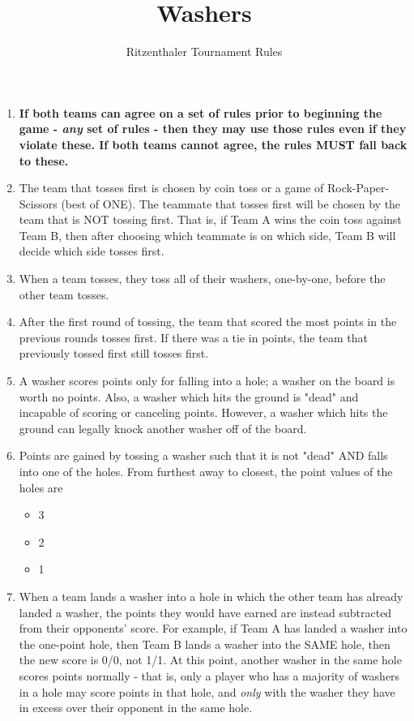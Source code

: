 \documentclass[a4paper]{article}
\title{Washers}
\author{Ritzenthaler Tournament Rules}
\begin{document}
\maketitle
\begin{enumerate}
\item \textbf{If both teams can agree on a set of rules prior to beginning the game - \textit{any} set of rules - then they may use those rules even if they violate these. If both teams cannot agree, the rules MUST fall back to these.}
\item The team that tosses first is chosen by coin toss or a game of Rock-Paper-Scissors (best of ONE). The teammate that tosses first will be chosen by the team that is NOT tossing first. That is, if Team A wins the coin toss against Team B, then after choosing which teammate is on which side, Team B will decide which side tosses first.
\item When a team tosses, they toss all of their washers, one-by-one, before the other team tosses.
\item After the first round of tossing, the team that scored the most points in the previous rounds tosses first. If there was a tie in points, the team that previously tossed first still tosses first.
\item A washer scores points only for falling into a hole; a washer on the board is worth no points. Also, a washer which hits the ground is "dead" and incapable of scoring or canceling points. However, a washer which hits the ground can legally knock another washer off of the board.
\item Points are gained by tossing a washer such that it is not "dead" AND falls into one of the holes. From furthest away to closest, the point values of the holes are
\begin{itemize}
	\item 3
	\item 2
	\item 1
\end{itemize}
\item When a team lands a washer into a hole in which the other team has already landed a washer, the points they would have earned are instead subtracted from their opponents' score. For example, if Team A has landed a washer into the one-point hole, then Team B lands a washer into the SAME hole, then the new score is 0/0, not 1/1. At this point, another washer in the same hole scores points normally - that is, only a player who has a majority of washers in a hole may score points in that hole, and \textit{only} with the washer they have in excess over their opponent in the same hole.

\end{enumerate}
\end{document}
